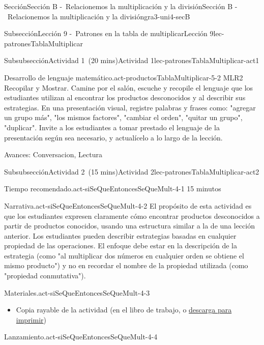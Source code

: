 \documentclass[oneside,10pt,]{article}
\begin{document}
\begin{sectionptx}{Sección}{Sección B -~Relacionemos la multiplicación y la división}{}{Sección B -~Relacionemos la multiplicación y la división}{}{}{gra3-uni4-secB}
\begin{subsectionptx}{Subsección}{Lección 9 -~Patrones en la tabla de multiplicar}{}{Lección 9}{}{}{lec-patronesTablaMultiplicar}
\begin{subsubsectionptx}{Subsubsección}{Actividad 1~(20 mins)}{}{Actividad 1}{}{}{lec-patronesTablaMultiplicar-act1}
\begin{paragraphs}{Desarrollo de lenguaje matemático.}{act-productosTablaMultiplicar-5-2}
MLR2 Recopilar y Mostrar. Camine por el salón, escuche y recopile el lenguaje que los estudiantes utilizan al encontrar los productos desconocidos y al describir sus estrategias. En una presentación visual, registre palabras y frases como: "agregar un grupo más", "los mismos factores", "cambiar el orden", "quitar un grupo", "duplicar". Invite a los estudiantes a tomar prestado el lenguaje de la presentación según sea necesario, y actualícelo a lo largo de la lección.%
\par
Avances: Conversacion, Lectura%
\end{paragraphs}%
\end{subsubsectionptx}
%
%
\typeout{************************************************}
\typeout{************************************************}
%
\begin{subsubsectionptx}{Subsubsección}{Actividad 2~(15 mins)}{}{Actividad 2}{}{}{lec-patronesTablaMultiplicar-act2}
\par
\begin{paragraphs}{Tiempo recomendado.}{act-siSeQueEntoncesSeQueMult-4-1}%
15 minutos%
\end{paragraphs}%
\begin{paragraphs}{Narrativa.}{act-siSeQueEntoncesSeQueMult-4-2}%
El propósito de esta actividad es que los estudiantes expresen claramente cómo encontrar productos desconocidos a partir de productos conocidos, usando una estructura similar a la de una lección anterior. Los estudiantes pueden describir estrategias basadas en cualquier propiedad de las operaciones. El enfoque debe estar en la descripción de la estrategia (como "al multiplicar dos números en cualquier orden se obtiene el mismo producto") y no en recordar el nombre de la propiedad utilizada (como "propiedad conmutativa").%
\end{paragraphs}%
\begin{paragraphs}{Materiales.}{act-siSeQueEntoncesSeQueMult-4-3}%
%
\begin{itemize}[label=\textbullet]
\item{}Copia rayable de la actividad (en el libro de trabajo, o \href{external/act-pdf/act-siSeQueEntoncesSeQueMult.pdf}{descarga para imprimir}\footnotemark{})%
\end{itemize}
\end{paragraphs}%
\begin{paragraphs}{Lanzamiento.}{act-siSeQueEntoncesSeQueMult-4-4}%
%
\begin{itemize}[label=\textbullet]

\end{itemize}
\end{paragraphs}
\end{subsubsectionptx}
\end{subsectionptx}
\end{sectionptx}
\end{document}
